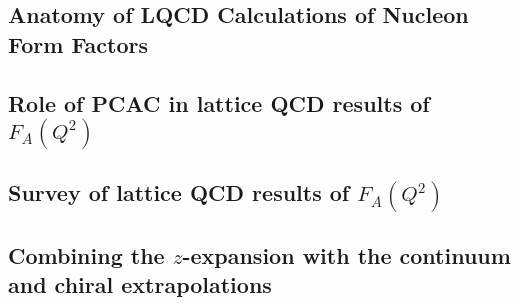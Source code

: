 



%

\subsection{Anatomy of LQCD Calculations of Nucleon Form Factors\label{sec:calc_anatomy}}


\subsection{Role of PCAC in lattice QCD results of $F_A(Q^2)$\label{sec:lqcd_pcac}}


\subsection{Survey of lattice QCD results of $F_A(Q^2)$\label{sec:lqcd_results}}


\subsection{Combining the $z$-expansion with the continuum and chiral extrapolations\label{sec:z_continuum}}

